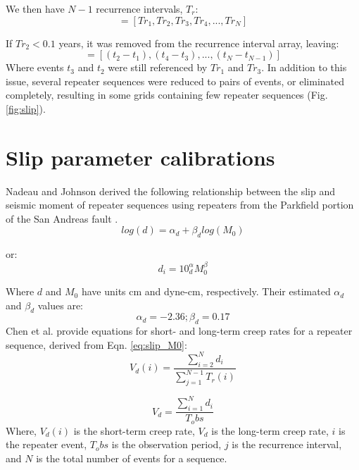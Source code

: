 \documentclass{article}
\begin{document}
We then have $N-1$ recurrence intervals, $T_r$:
\begin{equation}
    [(t_2 - t_1), (t_3 - t_2), (t_4 - t_3),..., (t_N - t_{N-1})] =  [Tr_1, Tr_2, Tr_3, Tr_4, ..., Tr_N]
    \label{eq:Tr}
\end{equation}

If $Tr_2 < 0.1$ years, it was removed from the recurrence interval array,  leaving:
\begin{equation}
    [Tr_1, Tr_3, Tr_4, ... Tr_N] =
    [(t_2 - t_1), (t_4 - t_3),..., (t_N - t_{N-1})]
    \label{eq:Tr_filter}
\end{equation}
Where events $t_3$ and $t_2$ were still referenced by $Tr_1$ and $Tr_3$.
In addition to this issue, several repeater sequences were reduced to pairs of events, or eliminated completely, resulting in some grids containing few repeater sequences (Fig.\ref{fig:slip}).

\section{Slip parameter calibrations}
Nadeau and Johnson derived the following relationship between the slip and seismic moment of repeater sequences using repeaters from the Parkfield portion of the San Andreas fault \cite{nadeau98,nadeau04}.
\begin{equation}
    log(d) = \alpha_d + \beta_d log(M_0)
    \label{eq:slip_M0}
\end{equation}

or:
\begin{equation}
    d_i = 10^\alpha_d M_0 ^\beta
    \label{eq:slip_M0_2}
\end{equation}

Where $d$ and $M_0$ have units cm and dyne-cm, respectively. Their estimated $\alpha_d$ and $\beta_d$ values are:
\begin{equation}
    \alpha_d = -2.36; \beta_d = 0.17
    \label{eq:parkfield_const}
\end{equation}
Chen et al. provide equations for short- and long-term creep rates for a repeater sequence, derived from Eqn. \ref{eq:slip_M0}\cite{chen08}:
\begin{equation}
    V_d(i) = \frac{\sum_{i=2}^{N} d_i}{\sum_{j=1}^{N-1} T_r(i)}
    \label{eq:Vd_short}
\end{equation}

\begin{equation}
    V_d = \frac{\sum_{i=1}^{N} d_i}{T_obs}
    \label{eq:Vd_long}
\end{equation}
Where, $V_d(i)$ is the short-term creep rate, $V_d$ is the long-term creep rate, $i$ is the repeater event, $T_obs$ is the observation period, $j$ is the recurrence interval, and $N$ is the total number of events for a sequence.
\end{document}
